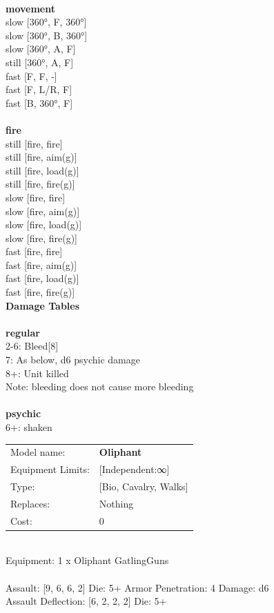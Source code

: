 \ \\ {\bf movement } \\
slow [360°, F, 360°] \\
slow [360°, B, 360°] \\
slow [360°, A, F] \\
still [360°, A, F] \\
fast [F, F, -] \\
fast [F, L/R, F] \\
fast [B, 360°, F] \\
\ \\ {\bf fire } \\
still [fire, fire] \\
still [fire, aim(g)] \\
still [fire, load(g)] \\
still [fire, fire(g)] \\
slow [fire, fire] \\
slow [fire, aim(g)] \\
slow [fire, load(g)] \\
slow [fire, fire(g)] \\
fast [fire, fire] \\
fast [fire, aim(g)] \\
fast [fire, load(g)] \\
fast [fire, fire(g)] \\


{\bf Damage Tables} \\
\ \\ {\bf regular } \\
2-6: Bleed[8]  \\
7: As below, d6 psychic damage \\
8+: Unit killed \\
Note: bleeding does not cause more bleeding \\
\ \\ {\bf psychic } \\
6+: shaken \\


\noindent
\begin{tabular}{ll}
Model name: &{\bf Oliphant } \\
Equipment Limits: &[Independent:∞] \\
Type: &[Bio, Cavalry, Walks] \\
Replaces: &Nothing \\
Cost: & 0\\
\end{tabular}
\ \\
Equipment: 1 x Oliphant GatlingGuns \\
\ \\
Assault: [9, 6, 6, 2] Die: 5+ Armor Penetration: 4 Damage: d6 \\
Assault Deflection: [6, 2, 2, 2] Die: 5+\\
\indent  
\ \\

